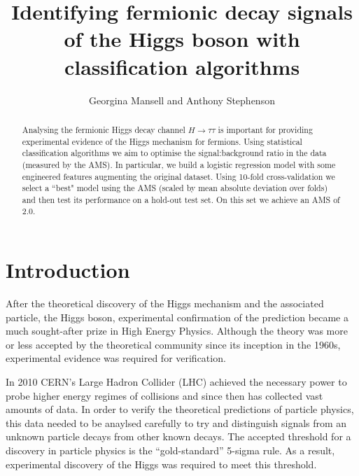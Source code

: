 

\usepackage[toc,page]{appendix}
\usepackage{fancyhdr}
\usepackage{enumitem}
\usepackage{pifont}

\graphicspath{{./figs/}}

\pagestyle{fancy}
\rhead{}
\lhead{}

\author{Georgina Mansell and Anthony Stephenson}
\date{}
\title{Identifying fermionic decay signals of the Higgs boson with classification algorithms}


\maketitle
\begin{abstract}
    Analysing the fermionic Higgs decay channel $H\rightarrow\tau\tau$ is important for providing experimental evidence of the Higgs mechanism for fermions. Using statistical classification algorithms we aim to optimise the signal:background ratio in the data (measured by the AMS). In particular, we build a logistic regression model with some engineered features augmenting the original dataset. Using 10-fold cross-validation we select a ``best" model using the AMS (scaled by mean absolute deviation over folds) and then test its performance on a hold-out test set. On this set we achieve an AMS of 2.0.
\end{abstract}

\section{Introduction}
After the theoretical discovery of the Higgs mechanism and the associated particle, the Higgs boson, experimental confirmation of the prediction became a much sought-after prize in High Energy Physics. Although the theory was more or less accepted by the theoretical community since its inception in the 1960s, experimental evidence was required for verification. 

In 2010 CERN's Large Hadron Collider (LHC) achieved the necessary power to probe higher energy regimes of collisions and since then has collected vast amounts of data. In order to verify the theoretical predictions of particle physics, this data needed to be anaylsed carefully to try and distinguish signals from an unknown particle decays from other known decays. The accepted threshold for a discovery in particle physics is the ``gold-standard'' 5-sigma rule. As a result, experimental discovery of the Higgs was required to meet this threshold. 

